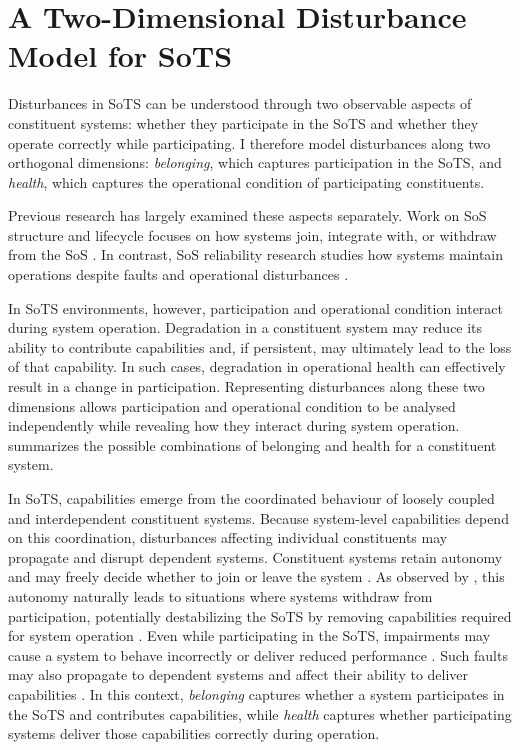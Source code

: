 \section{A Two-Dimensional Disturbance Model for SoTS}
\label{sec:two-dimensional-disturbances}

Disturbances in SoTS can be understood through two observable aspects of constituent systems: whether they participate in the SoTS and whether they operate correctly while participating. I therefore model disturbances along two orthogonal dimensions: \emph{belonging}, which captures participation in the SoTS, and \emph{health}, which captures the operational condition of participating constituents.

Previous research has largely examined these aspects separately. Work on SoS structure and lifecycle focuses on how systems join, integrate with, or withdraw from the SoS \cite{axelsson2019refined,svenson2020situation,hristozov2023modeling}. In contrast, SoS reliability research studies how systems maintain operations despite faults and operational disturbances \cite{ferreira2024framework,uday2015designing,garro2014reliability,li2025reliability}.

In SoTS environments, however, participation and operational condition interact during system operation. Degradation in a constituent system may reduce its ability to contribute capabilities and, if persistent, may ultimately lead to the loss of that capability. In such cases, degradation in operational health can effectively result in a change in participation. Representing disturbances along these two dimensions allows participation and operational condition to be analysed independently while revealing how they interact during system operation.  summarizes the possible combinations of belonging and health for a constituent system.




In SoTS, capabilities emerge from the coordinated behaviour of loosely coupled and interdependent constituent systems. Because system-level capabilities depend on this coordination, disturbances affecting individual constituents may propagate and disrupt dependent systems. Constituent systems retain autonomy and may freely decide whether to join or leave the system \cite{boardman2006system,baldwin2011formation}. As observed by \citet{salado2015abandonment}, this autonomy naturally leads to situations where systems withdraw from participation, potentially destabilizing the SoTS by removing capabilities required for system operation \cite{salado2016exile}. Even while participating in the SoTS, impairments may cause a system to behave incorrectly or deliver reduced performance \cite{abbott1990resourceful}. Such faults may also propagate to dependent systems and affect their ability to deliver capabilities \cite{ferreira2024framework,avizienis2004basic}. In this context, \emph{belonging} captures whether a system participates in the SoTS and contributes capabilities, while \emph{health} captures whether participating systems deliver those capabilities correctly during operation.


